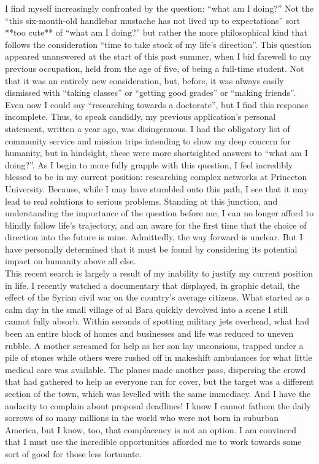\documentclass[11pt]{article}
\begin{document}
I find myself increasingly confronted by the question: ``what am I doing?'' Not the ``this six-month-old handlebar mustache has not lived up to expectations'' sort **too cute** of  ``what am I doing?'' but rather the more philosophical kind that follows the consideration ``time to take stock of my life's direction''. This question appeared unanswered at the start of this past summer, when I bid farewell to my previous occupation, held from the age of five, of being a full-time student. Not that it was an entirely new consideration, but, before, it was always easily dismissed with ``taking classes'' or ``getting good grades'' or ``making friends''. Even now I could say ``researching towards a doctorate'', but I find this response incomplete. Thus, to speak candidly, my previous application's personal statement, written a year ago, was disingenuous. I had the obligatory list of community service and mission trips intending to show my deep concern for humanity, but in hindsight, these were more shortsighted answers to ``what am I doing?''. As I begin to more fully grapple with this question, I feel incredibly blessed to be in my current position: researching complex networks at Princeton University. Because, while I may have stumbled onto this path, I see that it may lead to real solutions to serious problems. Standing at this junction, and understanding the importance of the question before me, I can no longer afford to blindly follow life's trajectory, and am aware for the first time that the choice of direction into the future is mine. Admittedly, the way forward is unclear. But I have personally determined that it must be found by considering its potential impact on humanity above all else.\\

This recent search is largely a result of my inability to justify my current position in life. I recently watched a documentary that displayed, in graphic detail, the effect of the Syrian civil war on the country's average citizens. What started as a calm day in the small village of al Bara quickly devolved into a scene I still cannot fully absorb. Within seconds of spotting military jets overhead, what had been an entire block of homes and businesses and life was reduced to uneven rubble. A mother screamed for help as her son lay unconsious, trapped under a pile of stones while others were rushed off in makeshift ambulances for what little medical care was available. The planes made another pass, dispersing the crowd that had gathered to help as everyone ran for cover, but the target was a different section of the town, which was levelled with the same immediacy. And I have the audacity to complain about proposal deadlines! I know I cannot fathom the daily sorrows of so many millions in the world who were not born in suburban America, but I know, too, that complacency is not an option. I am convinced that I must use the incredible opportunities afforded me to work towards some sort of good for those less fortunate.\\
\end{document}
